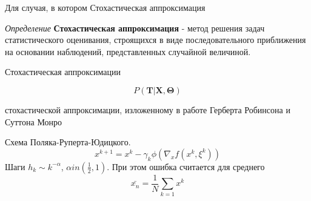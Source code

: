 Для случая, в котором 
Стохастическая аппроксимация 


\textit{Определение} \textbf{Стохастическая аппроксимация} - метод решения задач статистического оценивания,
 строящихся в виде последовательного приближения на основании наблюдений, представленных случайной величиной.

Стохастическая аппроксимации

$$
    P(\mathbf{T}| \mathbf{X},\mathbf{\Theta})
$$

стохастической аппроксимации,
 изложенному в работе Герберта Робинсона и Суттона Монро \cite{robbins1951stochastic}

 Схема Поляка-Руперта-Юдицкого. 
\begin{equation}
    x^{k+1} = x^{k} - \gamma_k \phi(\nabla_x f(x^k,\xi^k))
\end{equation}
Шаги $h_k \sim k^{-\alpha}$, $\alpha in (\frac{1}{2},1)$.
При этом ошибка считается для среднего
\begin{equation}
    \bar{x_n} = \frac{1}{N} \sum_{k=1} x^k
\end{equation}

